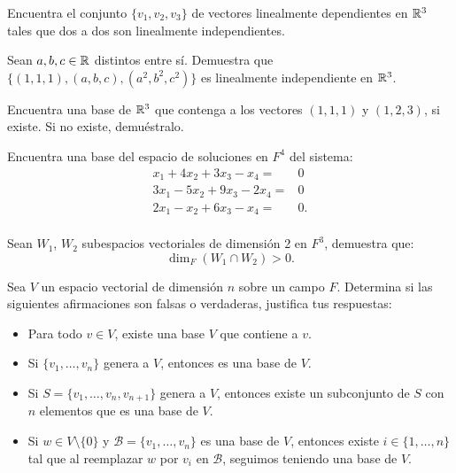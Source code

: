 \documentclass[12pt,a4paper]{book}
\newcommand{\llaves}[1]{\{#1\}}
\begin{document}
    \begin{ejercicio}
        Encuentra el conjunto $\llaves{v_{1}, v_{2}, v_{3}}$ de vectores linealmente dependientes en $\mathbb{R}^{3}$ tales que dos a dos son linealmente independientes.
    \end{ejercicio}

    \begin{ejercicio}
        Sean $a,b,c \in \mathbb{R}$ distintos entre sí. Demuestra que $\llaves{(1, 1, 1), (a, b, c), (a^{2}, b^{2}, c^{2})}$ es linealmente independiente en $\mathbb{R}^{3}$.
    \end{ejercicio}

    \begin{ejercicio}
        Encuentra una base de $\mathbb{R}^{3}$ que contenga a los vectores $(1, 1, 1)$ y $(1, 2, 3)$, si existe. Si no existe, demuéstralo.
    \end{ejercicio}

    \begin{ejercicio}
        Encuentra una base del espacio de soluciones en $F^{4}$ del sistema:
        \begin{align*}
            x_{1} + 4x_{2} + 3x_{3} - x_{4} = & 0\\
            3x_{1} - 5x_{2} + 9x_{3} - 2x_{4} = & 0\\
            2x_{1} - x_{2} + 6x_{3} - x_{4} = & 0.\\
        \end{align*}
    \end{ejercicio}

    \begin{ejercicio}
        Sean $W_{1}$, $W_{2}$ subespacios vectoriales de dimensión 2 en $F^{3}$, demuestra que:
        \begin{equation*}
        \dim_{F}(W_{1} \cap W_{2}) > 0.
        \end{equation*}
    \end{ejercicio}

    \begin{ejercicio}
        Sea $V$ un espacio vectorial de dimensión $n$ sobre un campo $F$. Determina si las siguientes afirmaciones son falsas o verdaderas, justifica tus respuestas:
        \begin{itemize}
            \item[(a)] Para todo $v \in V$, existe una base $V$ que contiene a $v$.
            \item[(b)] Si $\llaves{v_{1}, \dots, v_{n}}$ genera a $V$, entonces es una base de $V$.
            \item[(c)] Si $S = \llaves{v_{1}, \dots, v_{n}, v_{n+1}}$ genera a $V$, entonces existe un subconjunto de $S$ con $n$ elementos que es una base de $V$.
            \item[(d)] Si $w \in V \setminus \llaves{0}$ y $\mathcal{B} = \llaves{v_{1}, \dots, v_{n}}$ es una base de $V$, entonces existe $i \in \llaves{1, \dots, n}$ tal que al reemplazar $w$ por $v_{i}$ en $\mathcal{B}$, seguimos teniendo una base de $V$.
        \end{itemize}
    \end{ejercicio}
\end{document}
